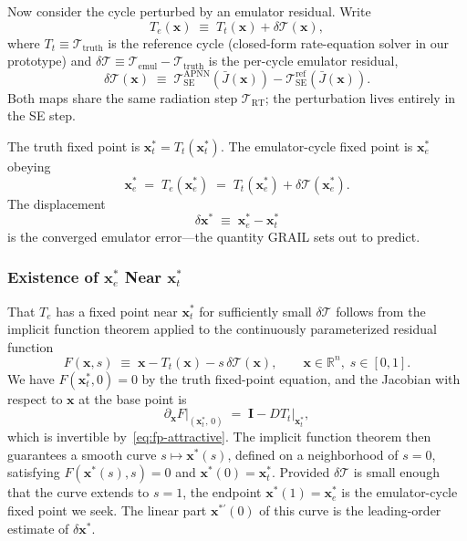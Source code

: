 \documentclass[11pt]{article}
\newcommand{\Tcyc}{\mathcal{T}}
\newcommand{\Trt}{\Tcyc_{\mathrm{RT}}}
\newcommand{\Tse}{\Tcyc_{\mathrm{SE}}}
\newcommand{\dT}{\delta\Tcyc}
\newcommand{\Jbar}{\bar{J}}
\begin{document}
Now consider the cycle perturbed by an emulator residual.  Write
\begin{equation}
T_e(\mathbf{x}) \;\equiv\; T_t(\mathbf{x}) + \dT(\mathbf{x}),
\label{eq:Te-def}
\end{equation}
where $T_t \equiv \Tcyc_{\text{truth}}$ is the reference cycle (closed-form
rate-equation solver in our prototype) and $\dT \equiv \Tcyc_{\text{emul}}
- \Tcyc_{\text{truth}}$ is the per-cycle emulator residual,
\begin{equation}
\dT(\mathbf{x}) \;\equiv\; \Tse^{\text{APNN}}\!\left(\Jbar(\mathbf{x})\right) - \Tse^{\text{ref}}\!\left(\Jbar(\mathbf{x})\right) .
\end{equation}
Both maps share the same radiation step $\Trt$; the perturbation lives
entirely in the SE step.

The truth fixed point is $\mathbf{x}_t^* = T_t(\mathbf{x}_t^*)$.  The
emulator-cycle fixed point is $\mathbf{x}_e^*$ obeying
\begin{equation}
\mathbf{x}_e^* \;=\; T_e(\mathbf{x}_e^*) \;=\; T_t(\mathbf{x}_e^*) + \dT(\mathbf{x}_e^*) .
\label{eq:perturbed-fp}
\end{equation}
The displacement
\begin{equation}
\delta\mathbf{x}^{*} \;\equiv\; \mathbf{x}_e^* - \mathbf{x}_t^*
\end{equation}
is the converged emulator error---the quantity GRAIL sets out to predict.

\subsubsection{Existence of $\mathbf{x}_e^*$ Near $\mathbf{x}_t^*$}

That $T_e$ has a fixed point near $\mathbf{x}_t^*$ for sufficiently
small $\dT$ follows from the implicit function theorem applied to the
continuously parameterized residual function
\begin{equation}
F(\mathbf{x}, s) \;\equiv\; \mathbf{x} - T_t(\mathbf{x}) - s\,\dT(\mathbf{x}),
\qquad \mathbf{x} \in \mathbb{R}^n,\; s \in [0, 1] .
\end{equation}
We have $F(\mathbf{x}_t^*, 0) = 0$ by the truth fixed-point equation, and
the Jacobian with respect to $\mathbf{x}$ at the base point is
\begin{equation}
\partial_{\mathbf{x}} F \big|_{(\mathbf{x}_t^*,\, 0)} \;=\; \mathbf{I} - DT_t\big|_{\mathbf{x}_t^*} ,
\end{equation}
which is invertible by~\eqref{eq:fp-attractive}.  The implicit function
theorem then guarantees a smooth curve $s \mapsto \mathbf{x}^*(s)$, defined
on a neighborhood of $s = 0$, satisfying $F(\mathbf{x}^*(s), s) = 0$ and
$\mathbf{x}^*(0) = \mathbf{x}_t^*$.  Provided $\dT$ is small enough that
the curve extends to $s = 1$, the endpoint $\mathbf{x}^*(1) = \mathbf{x}_e^*$
is the emulator-cycle fixed point we seek.  The linear part
$\mathbf{x}^{*\prime}(0)$ of this curve is the leading-order estimate of
$\delta\mathbf{x}^{*}$.
\end{document}
